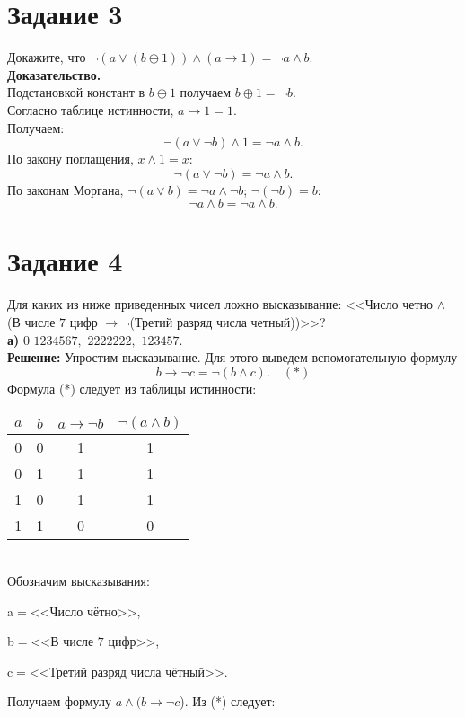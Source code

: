 \documentclass[a4paper,12pt]{article}
\begin{document}
\section*{Задание 3}
Докажите, что $\neg (a\vee (b \oplus 1))\wedge (a \rightarrow 1)=\neg a \wedge b.$ \\
{\bf Доказательство.} \\
Подстановкой констант в $b \oplus 1$ получаем $b \oplus 1 = \neg b$. \\
Согласно таблице истинности, $a \rightarrow 1 = 1$. \\
Получаем:
$$\neg (a\vee \neg b)\wedge 1 =\neg a \wedge b.$$
По закону поглащения, $x \wedge 1 = x$:
$$\neg (a\vee \neg b) =\neg a \wedge b.$$
По законам Моргана, $\neg(a \vee b) = \neg a \wedge \neg b$; $\neg (\neg b) = b$:
$$\neg a \wedge b = \neg a \wedge b.$$

\section*{Задание 4}
Для каких из ниже приведенных чисел ложно высказывание: <<Число четно $\wedge$ (В числе $7$ цифр $ \rightarrow \neg$(Третий разряд числа четный))>>? \\

{\bf а)} $0$  $1234567,$  $2222222,$   $123457.$ \\

{\bf Решение:} Упростим высказывание. Для этого выведем вспомогательную формулу $$b \rightarrow \neg c=\neg (b \wedge c). \quad (*)$$
Формула (*) следует из таблицы истинности:
\\

\begin{tabular}{|c|c|c|c|}
\hline$a$ & $b$ & $a\rightarrow \neg b$ & $\neg (a \wedge b)$ \\
\hline 0 & 0 & 1 & 1 \\
\hline 0 & 1 & 1 & 1 \\
\hline 1 & 0 & 1 & 1 \\
\hline 1 & 1 & 0 & 0 \\
\hline
\end{tabular}
\\

Обозначим высказывания:

a$=$<<Число чётно>>, 

b$=$<<В числе $7$ цифр>>,

c$=$<<Третий разряд числа чётный>>.

Получаем формулу $a\wedge (b \rightarrow \neg c$). Из (*) следует:
\end{document}
